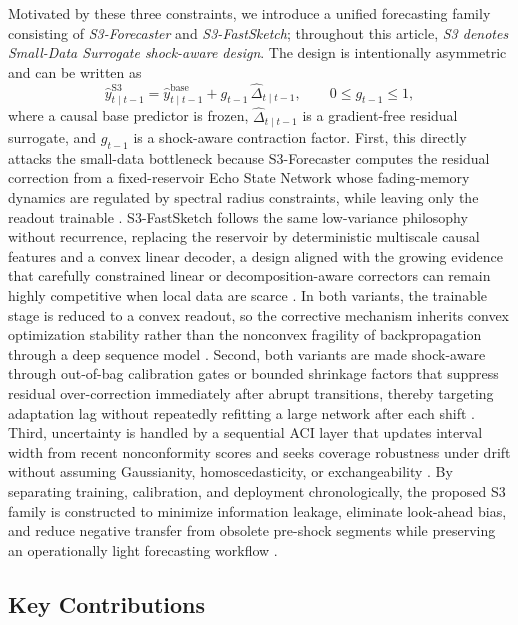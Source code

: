 \documentclass[review,number,sort&compress]{elsarticle}
\begin{document}
Motivated by these three constraints, we introduce a unified forecasting family consisting of \emph{S3-Forecaster} and \emph{S3-FastSketch}; throughout this article, \emph{S3 denotes Small-Data Surrogate shock-aware design}. The design is intentionally asymmetric and can be written as
\[
\hat{y}^{\mathrm{S3}}_{t \mid t-1}
=
\hat{y}^{\mathrm{base}}_{t \mid t-1}
+
g_{t-1}\,\hat{\Delta}_{t \mid t-1},
\qquad 0 \le g_{t-1} \le 1,
\]
where a causal base predictor is frozen, $\hat{\Delta}_{t \mid t-1}$ is a gradient-free residual surrogate, and $g_{t-1}$ is a shock-aware contraction factor. First, this directly attacks the small-data bottleneck because S3-Forecaster computes the residual correction from a fixed-reservoir Echo State Network whose fading-memory dynamics are regulated by spectral radius constraints, while leaving only the readout trainable \cite{jaeger2004science,armenio2019esn}. S3-FastSketch follows the same low-variance philosophy without recurrence, replacing the reservoir by deterministic multiscale causal features and a convex linear decoder, a design aligned with the growing evidence that carefully constrained linear or decomposition-aware correctors can remain highly competitive when local data are scarce \cite{zeng2023dlinear,gao2023sedan}. In both variants, the trainable stage is reduced to a convex readout, so the corrective mechanism inherits convex optimization stability rather than the nonconvex fragility of backpropagation through a deep sequence model \cite{lukosevicius2009reservoir}. Second, both variants are made shock-aware through out-of-bag calibration gates or bounded shrinkage factors that suppress residual over-correction immediately after abrupt transitions, thereby targeting adaptation lag without repeatedly refitting a large network after each shift \cite{zhang2024d3a,zhao2024proceed}. Third, uncertainty is handled by a sequential ACI layer that updates interval width from recent nonconformity scores and seeks coverage robustness under drift without assuming Gaussianity, homoscedasticity, or exchangeability \cite{gibbs2021aci,xu2023spci}. By separating training, calibration, and deployment chronologically, the proposed S3 family is constructed to minimize information leakage, eliminate look-ahead bias, and reduce negative transfer from obsolete pre-shock segments while preserving an operationally light forecasting workflow \cite{cerqueira2020evaluation,burkner2020lfo}.


\subsection{Key Contributions}
\end{document}
